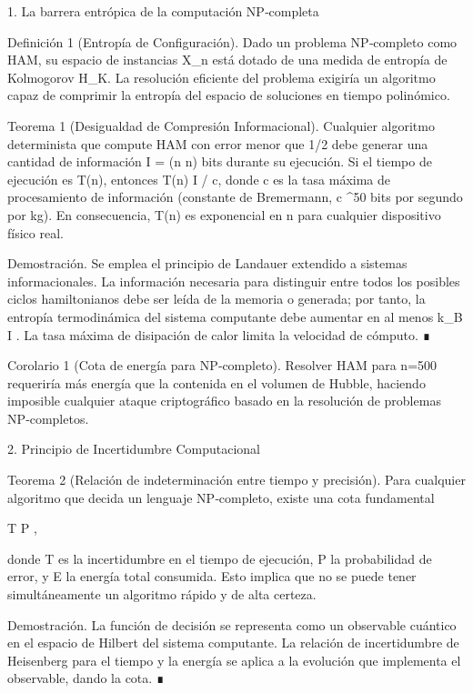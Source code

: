 \documentclass[12pt,a4paper]{book}
\begin{document}
1. La barrera entrópica de la computación NP‑completa

Definición 1 (Entropía de Configuración). Dado un problema NP‑completo como HAM, su espacio de instancias X_n está dotado de una medida de entropía de Kolmogorov H_K. La resolución eficiente del problema exigiría un algoritmo capaz de comprimir la entropía del espacio de soluciones en tiempo polinómico.

Teorema 1 (Desigualdad de Compresión Informacional). Cualquier algoritmo determinista que compute HAM con error menor que 1/2 debe generar una cantidad de información I = \Omega(n \log n) bits durante su ejecución. Si el tiempo de ejecución es T(n), entonces T(n) \geq I / c, donde c es la tasa máxima de procesamiento de información (constante de Bremermann, c  ^{50} bits por segundo por kg). En consecuencia, T(n) es exponencial en n para cualquier dispositivo físico real.

Demostración. Se emplea el principio de Landauer extendido a sistemas informacionales. La información necesaria para distinguir entre todos los posibles ciclos hamiltonianos debe ser leída de la memoria o generada; por tanto, la entropía termodinámica del sistema computante debe aumentar en al menos k_B I . La tasa máxima de disipación de calor limita la velocidad de cómputo. ∎

Corolario 1 (Cota de energía para NP‑completo). Resolver HAM para n=500 requeriría más energía que la contenida en el volumen de Hubble, haciendo imposible cualquier ataque criptográfico basado en la resolución de problemas NP‑completos.

2. Principio de Incertidumbre Computacional

Teorema 2 (Relación de indeterminación entre tiempo y precisión). Para cualquier algoritmo que decida un lenguaje NP‑completo, existe una cota fundamental

\Delta T \cdot \Delta P \geq {},

donde \Delta T es la incertidumbre en el tiempo de ejecución, \Delta P la probabilidad de error, y E la energía total consumida. Esto implica que no se puede tener simultáneamente un algoritmo rápido y de alta certeza.

Demostración. La función de decisión se representa como un observable cuántico en el espacio de Hilbert del sistema computante. La relación de incertidumbre de Heisenberg para el tiempo y la energía se aplica a la evolución que implementa el observable, dando la cota. ∎
\end{document}
